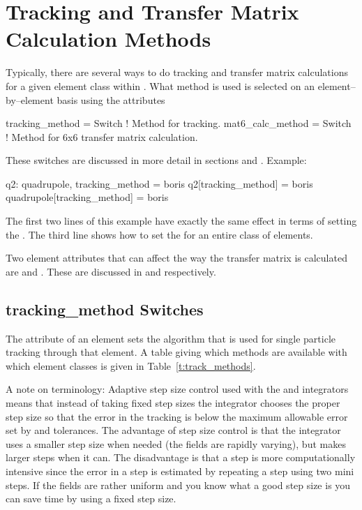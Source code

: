 \chapter{Tracking and Transfer Matrix Calculation Methods}
\label{c:methods}

Typically, there are several ways to do tracking and transfer matrix
calculations for a given element class within \bmad. What method is
used is selected on an element--by--element basis using the attributes
\begin{example}
  tracking_method = Switch   ! Method for tracking.
  mat6_calc_method = Switch  ! Method for 6x6 transfer matrix calculation.
\end{example}
These switches are discussed in more detail in sections  
and . Example:
\begin{example}
  q2: quadrupole, tracking_method = boris
  q2[tracking_method] = boris
  quadrupole[tracking_method] = boris
\end{example}
The first two lines of this example have exactly the same effect in
terms of setting the . The third line shows how to
set the  for an entire class of elements.

Two element attributes that can affect the way the transfer matrix is
calculated are  and . These are
discussed in  and  respectively.


\section{tracking_method Switches}
\label{s:tkm}

The  attribute of an element sets the algorithm that is
used for single particle tracking through that element.
A table giving which methods are available with which element classes is
given in Table~\ref{t:track_methods}.

A note on terminology: Adaptive step size control used with the
 and  integrators means that 
instead of taking fixed step sizes the integrator chooses the proper
step size so that the error in the tracking is below the maximum
allowable error set by  and  tolerances. The
advantage of step size control is that the integrator uses a smaller
step size when needed (the fields are rapidly varying), but makes
larger steps when it can. The disadvantage is that a step is more
computationally intensive since the error in a step is estimated by
repeating a step using two mini steps. If the fields are rather
uniform and you know what a good step size is you can save time by using
a fixed step size.

